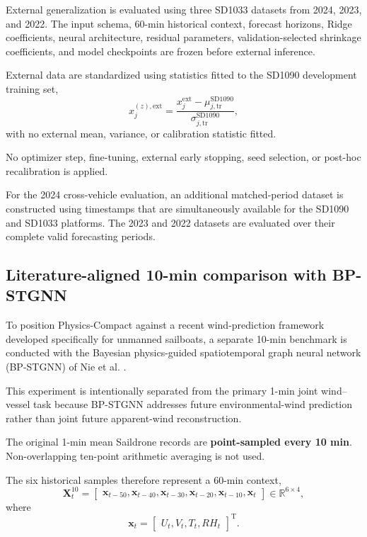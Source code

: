External generalization is evaluated using three SD1033 datasets from 2024, 2023, and 2022. The input schema, 60-min historical context, forecast horizons, Ridge coefficients, neural architecture, residual parameters, validation-selected shrinkage coefficients, and model checkpoints are frozen before external inference.

External data are standardized using statistics fitted to the SD1090 development training set,
\begin{equation}
x_j^{(z),\mathrm{ext}}
=
\frac{
x_j^{\mathrm{ext}}
-
\mu_{j,\mathrm{tr}}^{\mathrm{SD1090}}
}{
\sigma_{j,\mathrm{tr}}^{\mathrm{SD1090}}
},
\label{eq:external_standardization}
\end{equation}
with no external mean, variance, or calibration statistic fitted.

No optimizer step, fine-tuning, external early stopping, seed selection, or post-hoc recalibration is applied.

For the 2024 cross-vehicle evaluation, an additional matched-period dataset is constructed using timestamps that are simultaneously available for the SD1090 and SD1033 platforms. The 2023 and 2022 datasets are evaluated over their complete valid forecasting periods.

\subsection{Literature-aligned 10-min comparison with BP-STGNN}
\label{subsec:bp_benchmark}

To position Physics-Compact against a recent wind-prediction framework developed specifically for unmanned sailboats, a separate 10-min benchmark is conducted with the Bayesian physics-guided spatiotemporal graph neural network (BP-STGNN) of Nie et al. \cite{Nie2026}.

This experiment is intentionally separated from the primary 1-min joint wind--vessel task because BP-STGNN addresses future environmental-wind prediction rather than joint future apparent-wind reconstruction.

The original 1-min mean Saildrone records are \textbf{point-sampled every 10 min}. Non-overlapping ten-point arithmetic averaging is not used.

The six historical samples therefore represent a 60-min context,
\begin{equation}
\mathbf X_t^{10}
=
\begin{bmatrix}
\mathbf x_{t-50},
\mathbf x_{t-40},
\mathbf x_{t-30},
\mathbf x_{t-20},
\mathbf x_{t-10},
\mathbf x_t
\end{bmatrix}
\in
\mathbb R^{6\times4},
\label{eq:bp_input}
\end{equation}
where
\begin{equation}
\mathbf x_t
=
\begin{bmatrix}
U_t,
V_t,
T_t,
RH_t
\end{bmatrix}^{\mathrm T}.
\end{equation}

